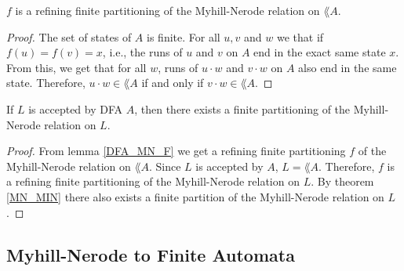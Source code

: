 \begin{lemma} 
    \label{DFA_MN_F}
    $f$ is a refining finite partitioning of the Myhill-Nerode relation on $\lang{A}$. 
\end{lemma} 
\begin{proof} 
    The set of states of $A$ is finite.
    For all $u, v$ and $w$ we that if $f(u) = f(v) = x$, i.e.,
    the runs of $u$ and $v$ on $A$ end in the exact same state $x$.
    From this, we get that for all $w$, runs of $u \cdot w$ and $v \cdot w$ on $A$ also end in the same state.
    Therefore, $u\cdot w \in \lang{A}$ if and only if $v \cdot w \in \lang{A}$.
\end{proof}

\begin{theorem}
    If $L$ is accepted by DFA $A$, then there exists a finite partitioning of the Myhill-Nerode relation on $L$.
\end{theorem}
\begin{proof}
    From lemma \ref{DFA_MN_F} we get a refining finite partitioning $f$ of the Myhill-Nerode relation on $\lang{A}$. 
    Since $L$ is accepted by $A$, $L = \lang{A}$. 
    Therefore, $f$ is a refining finite partitioning of the Myhill-Nerode relation on $L$.
    By theorem \ref{MN_MIN} there also exists a finite partition of the Myhill-Nerode relation on $L$.
\end{proof}


\subsection{Myhill-Nerode to Finite Automata}

\paragraph{}


